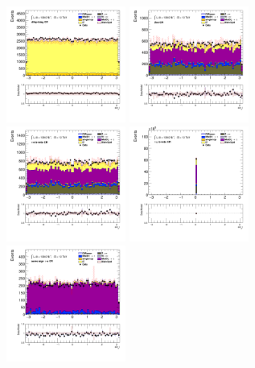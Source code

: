 		\begin{figure}[!htp]
			\begin{center}    
			\includegraphics[width=0.35\textwidth]{chapters/chapter6_HPlus/images/taulep/el_0_phi_DILEP_BTAG.png}
			\includegraphics[width=0.35\textwidth]{chapters/chapter6_HPlus/images/taulep/el_0_phi_ZEE.png} \\
			\includegraphics[width=0.35\textwidth]{chapters/chapter6_HPlus/images/taulep/el_0_phi_TAUEL_BVETO.png} 
			\includegraphics[width=0.35\textwidth]{chapters/chapter6_HPlus/images/taulep/el_0_phi_TAUMU_BVETO.png} \\
			\includegraphics[width=0.35\textwidth]{chapters/chapter6_HPlus/images/taulep/el_0_phi_SS_TAUEL.png} 

\end{center}
\end{figure}
